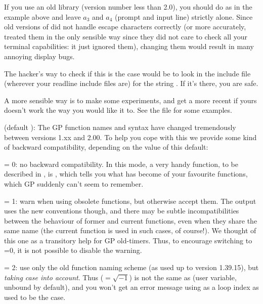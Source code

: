 
If you use an old  library (version number less than 2.0),
you should do as in the example above and leave $a_3$ and $a_4$ (prompt
and input line) strictly alone. Since old versions of  did
not handle escape characters correctly (or more accurately, treated them
in the only sensible way since they did not care to check all your terminal
capabilities: it just ignored them), changing them would result in many
annoying display bugs.

The hacker's way to check if this is the case would be to look in the
 include file (wherever your readline include files are) for
the string . If it's there, you are safe.

A more sensible way is to make some experiments, and get a more recent
 if yours doesn't work the way you would like it to. See the
file  for some examples.

 (default ): The GP function names and syntax
have changed tremendously between versions 1.xx and 2.00. To help you cope
with this we provide some kind of backward compatibility, depending on the
value of this default:

\quad {} = 0: no backward compatibility. In this mode, a very
handy function, to be described in , is ,
which tells you what has become of your favourite functions, which GP
suddenly can't seem to remember.

\quad {} = 1: warn when using obsolete functions, but
otherwise accept them. The output uses the new conventions though, and
there may be subtle incompatibilities between the behaviour of former and
current functions, even when they share the same name (the current function
is used in such cases, of course!). We thought of this one as a transitory
help for GP old-timers. Thus, to encourage switching to =0,
it is not possible to disable the warning.

\quad {} = 2: use only the old function naming scheme (as
used up to version 1.39.15), but \emph{taking case into account}. Thus
 (${}=\sqrt{-1}$) is not the same as  (user variable, unbound
by default), and you won't get an error message using  as a loop
index as used to be the case.

